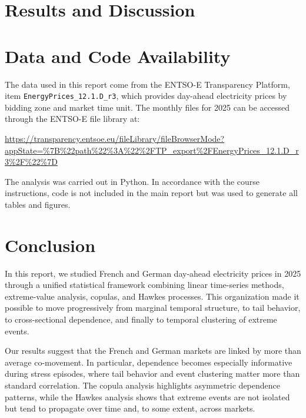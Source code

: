 \documentclass[11pt, a4paper]{article}
\theoremstyle{remark}
\begin{document}
\section{Results and Discussion}
\label{sec:results}


\section*{Data and Code Availability}

The data used in this report come from the ENTSO-E Transparency Platform, item \texttt{EnergyPrices\_12.1.D\_r3}, which provides day-ahead electricity prices by bidding zone and market time unit. The monthly files for 2025 can be accessed through the ENTSO-E file library at:

\url{https://transparency.entsoe.eu/fileLibrary/fileBrowserMode?appState=\%7B\%22path\%22\%3A\%22\%2FTP_export\%2FEnergyPrices_12.1.D_r3\%2F\%22\%7D}

The analysis was carried out in Python. In accordance with the course instructions, code is not included in the main report but was used to generate all tables and figures.

\section{Conclusion}
\label{sec:conclusion}

In this report, we studied French and German day-ahead electricity prices in 2025 through a unified statistical framework combining linear time-series methods, extreme-value analysis, copulas, and Hawkes processes. This organization made it possible to move progressively from marginal temporal structure, to tail behavior, to cross-sectional dependence, and finally to temporal clustering of extreme events.

Our results suggest that the French and German markets are linked by more than average co-movement. In particular, dependence becomes especially informative during stress episodes, where tail behavior and event clustering matter more than standard correlation. The copula analysis highlights asymmetric dependence patterns, while the Hawkes analysis shows that extreme events are not isolated but tend to propagate over time and, to some extent, across markets.
\end{document}
